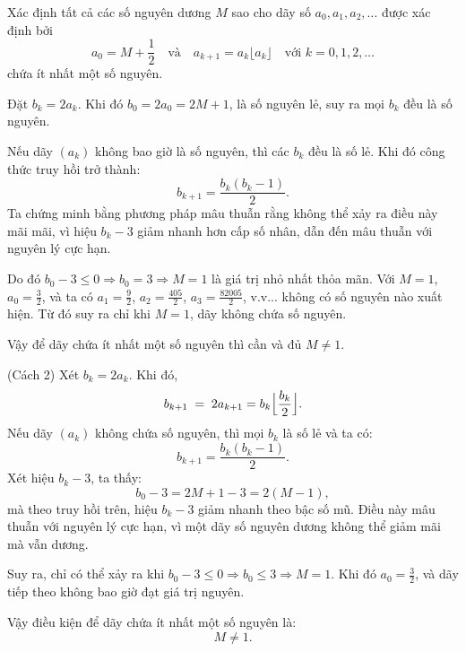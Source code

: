 \documentclass[../03-arithmetic-functions.tex]{subfiles}
\begin{document}
\begin{example*}
    Xác định tất cả các số nguyên dương \( M \) sao cho dãy số \( a_0, a_1, a_2, \dots \) được xác định bởi  
    \[
        a_0 = M + \frac{1}{2} \quad \text{và} \quad a_{k+1} = a_k \lfloor a_k \rfloor \quad \text{với } k = 0, 1, 2, \dots
    \]
    chứa ít nhất một số nguyên.
\end{example*}

\begin{story*}
    Đặt \( b_k = 2a_k \). Khi đó \( b_0 = 2a_0 = 2M + 1 \), là số nguyên lẻ, suy ra mọi \( b_k \) đều là số nguyên. 

    Nếu dãy \( (a_k) \) không bao giờ là số nguyên, thì các \( b_k \) đều là số lẻ. Khi đó công thức truy hồi trở thành:
    \[
        b_{k+1} = \frac{b_k(b_k - 1)}{2}.
    \]
    Ta chứng minh bằng phương pháp mâu thuẫn rằng không thể xảy ra điều này mãi mãi, vì hiệu \( b_k - 3 \) giảm nhanh hơn cấp số nhân, dẫn đến mâu thuẫn với nguyên lý cực hạn.

    Do đó \( b_0 - 3 \le 0 \Rightarrow b_0 = 3 \Rightarrow M = 1 \) là giá trị nhỏ nhất thỏa mãn. Với \( M = 1 \), \( a_0 = \tfrac{3}{2} \), và ta có \( a_1 = \tfrac{9}{2} \), \( a_2 = \tfrac{405}{2} \), \( a_3 = \tfrac{82005}{2} \), v.v... không có số nguyên nào xuất hiện. Từ đó suy ra chỉ khi \( M = 1 \), dãy không chứa số nguyên.

    Vậy để dãy chứa ít nhất một số nguyên thì cần và đủ \( \boxed{M \ne 1} \).
\end{story*}

\begin{soln}(Cách 2)\footnotemark
    Xét \( b_k = 2a_k \). Khi đó,    
    \[
        b_{k+1} \;=\; 2a_{k+1} = b_k \Bigl\lfloor \frac{b_k}{2} \Bigr\rfloor.
    \]
    Nếu dãy \( (a_k) \) không chứa số nguyên, thì mọi \( b_k \) là số lẻ và ta có:
    \[
        b_{k+1} = \frac{b_k (b_k - 1)}{2}.
    \]
    Xét hiệu \( b_k - 3 \), ta thấy:
    \[
        b_0 - 3 = 2M + 1 - 3 = 2(M - 1),
    \]
    mà theo truy hồi trên, hiệu \( b_k - 3 \) giảm nhanh theo bậc số mũ. Điều này mâu thuẫn với nguyên lý cực hạn, vì một dãy số nguyên dương không thể giảm mãi mà vẫn dương.

    Suy ra, chỉ có thể xảy ra khi \( b_0 - 3 \le 0 \Rightarrow b_0 \le 3 \Rightarrow M = 1 \). Khi đó \( a_0 = \tfrac{3}{2} \), và dãy tiếp theo không bao giờ đạt giá trị nguyên.

    Vậy điều kiện để dãy chứa ít nhất một số nguyên là:
    \[
        \boxed{M \ne 1}.
    \]
\end{soln}

\end{document}
